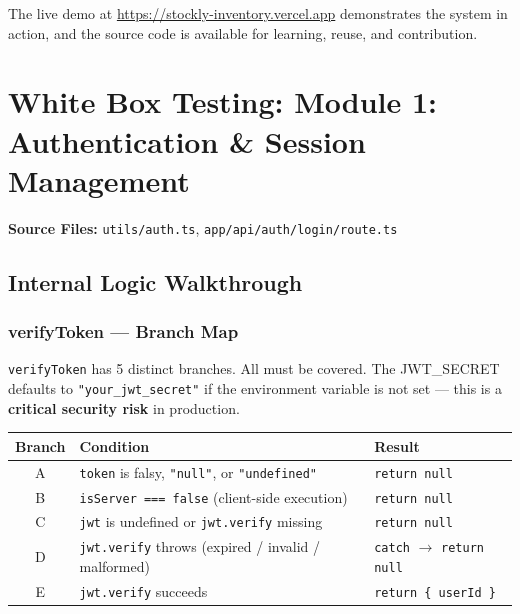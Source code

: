 \documentclass[12pt,onecolumn]{IEEEtran}
\let\oldsection\section
\renewcommand{\section}{\clearpage\oldsection}
\begin{document}
The live demo at \url{https://stockly-inventory.vercel.app} demonstrates the system in action, and the source code is available for learning, reuse, and contribution.





\appendix

\section{White Box Testing: Module 1: Authentication \& Session Management}


\textbf{Source Files:} \texttt{utils/auth.ts}, \texttt{app/api/auth/login/route.ts}

\subsection{Internal Logic Walkthrough}

\subsubsection{verifyToken --- Branch Map}


\texttt{verifyToken} has 5 distinct branches. All must be covered. The JWT\_SECRET
defaults to \texttt{"your\_jwt\_secret"} if the environment variable is not set ---
this is a \textbf{critical security risk} in production.


\begin{center}
\begin{tabular}{clp{7cm}}
  \toprule
  \textbf{Branch} & \textbf{Condition} & \textbf{Result} \\
  \midrule
  A & \texttt{token} is falsy, \texttt{"null"}, or \texttt{"undefined"} & \texttt{return null} \\
  B & \texttt{isServer === false} (client-side execution) & \texttt{return null} \\
  C & \texttt{jwt} is undefined or \texttt{jwt.verify} missing & \texttt{return null} \\
  D & \texttt{jwt.verify} throws (expired / invalid / malformed) & \texttt{catch} $\to$ \texttt{return null} \\
  E & \texttt{jwt.verify} succeeds & \texttt{return \{ userId \}} \\
  \bottomrule
\end{tabular}
\end{center}
\end{document}
